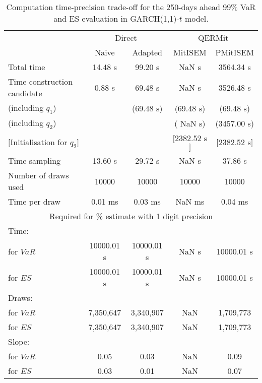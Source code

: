 { \renewcommand{\arraystretch}{1.3} 
\begin{table}[h] 
\centering 
\caption{Computation time-precision trade-off for the 250-days ahead  $99\%$ VaR and ES evaluation in GARCH(1,1)-$t$ model.} 
\label{tab:time_precision_t_garch2_noS} 
\begin{tabular}{lcccc}  
  & \multicolumn{2}{c}{Direct} & \multicolumn{2}{c}{QERMit}  \\ \cline{2-5} 
  & Naive & Adapted & MitISEM & PMitISEM  \\ \hline 
Total time & 14.48 s & 99.20 s &  NaN s & 3564.34 s \\ 
Time construction candidate & 0.88 s & 69.48 s &  NaN s & 3526.48 s \\ 
 (including $q_{1}$) &   &  (69.48 s) & (69.48 s) & (69.48 s) \\ 
 (including $q_{2}$) &   &  & ( NaN s) & (3457.00 s) \\ 
$[$Initialisation for $q_{2}$$]$&   &   & $[$2382.52 s$]$ & $[$2382.52 s$]$ \\ 
Time sampling & 13.60 s & 29.72 s &  NaN s & 37.86 s  \\  
Number of draws used & 10000 & 10000 & 10000 & 10000 \\ 
Time per draw & 0.01 ms & 0.03 ms &  NaN ms & 0.04 ms \\ \hline 
\multicolumn{5}{c}{Required for \% estimate with 1 digit precision} \\ \hline 
Time: &  &  &   &  \\ 
\hspace{1cm} for $VaR$ & 10000.01 s & 10000.01 s &  NaN s & 10000.01 s \\ 
\hspace{1cm} for $ES$ & 10000.01 s & 10000.01 s &  NaN s & 10000.01 s \\ 
Draws: &  &  &   &  \\ 
\hspace{1cm} for $VaR$ & 7,350,647 & 3,340,907  & NaN  & 1,709,773  \\ 
\hspace{1cm} for $ES$ & 7,350,647 & 3,340,907  & NaN   & 1,709,773  \\ 
\hline 
Slope: &  &  &   &  \\ 
\hspace{1cm} for $VaR$ & 0.05 & 0.03  &  NaN  & 0.09  \\ 
\hspace{1cm} for $ES$ & 0.03 & 0.01  &  NaN   & 0.07  \\  \hline 
\end{tabular} 
\end{table} 
} 
